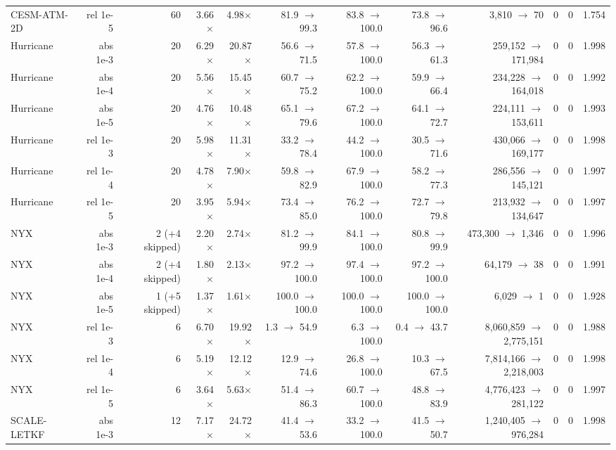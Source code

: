 \begin{tabular}{lrrrrrrrrrrr}
CESM-ATM-2D & rel 1e-5 & 60 & 3.66$\times$ & 4.98$\times$ & 81.9 $\to$ 99.3 & 83.8 $\to$ 100.0 & 73.8 $\to$ 96.6 & 3,810 $\to$ 70 & 0 & 0 & 1.754 \\
Hurricane & abs 1e-3 & 20 & 6.29$\times$ & 20.87$\times$ & 56.6 $\to$ 71.5 & 57.8 $\to$ 100.0 & 56.3 $\to$ 61.3 & 259,152 $\to$ 171,984 & 0 & 0 & 1.998 \\
Hurricane & abs 1e-4 & 20 & 5.56$\times$ & 15.45$\times$ & 60.7 $\to$ 75.2 & 62.2 $\to$ 100.0 & 59.9 $\to$ 66.4 & 234,228 $\to$ 164,018 & 0 & 0 & 1.992 \\
Hurricane & abs 1e-5 & 20 & 4.76$\times$ & 10.48$\times$ & 65.1 $\to$ 79.6 & 67.2 $\to$ 100.0 & 64.1 $\to$ 72.7 & 224,111 $\to$ 153,611 & 0 & 0 & 1.993 \\
Hurricane & rel 1e-3 & 20 & 5.98$\times$ & 11.31$\times$ & 33.2 $\to$ 78.4 & 44.2 $\to$ 100.0 & 30.5 $\to$ 71.6 & 430,066 $\to$ 169,177 & 0 & 0 & 1.998 \\
Hurricane & rel 1e-4 & 20 & 4.78$\times$ & 7.90$\times$ & 59.8 $\to$ 82.9 & 67.9 $\to$ 100.0 & 58.2 $\to$ 77.3 & 286,556 $\to$ 145,121 & 0 & 0 & 1.997 \\
Hurricane & rel 1e-5 & 20 & 3.95$\times$ & 5.94$\times$ & 73.4 $\to$ 85.0 & 76.2 $\to$ 100.0 & 72.7 $\to$ 79.8 & 213,932 $\to$ 134,647 & 0 & 0 & 1.997 \\
NYX & abs 1e-3 & 2 (+4 skipped) & 2.20$\times$ & 2.74$\times$ & 81.2 $\to$ 99.9 & 84.1 $\to$ 100.0 & 80.8 $\to$ 99.9 & 473,300 $\to$ 1,346 & 0 & 0 & 1.996 \\
NYX & abs 1e-4 & 2 (+4 skipped) & 1.80$\times$ & 2.13$\times$ & 97.2 $\to$ 100.0 & 97.4 $\to$ 100.0 & 97.2 $\to$ 100.0 & 64,179 $\to$ 38 & 0 & 0 & 1.991 \\
NYX & abs 1e-5 & 1 (+5 skipped) & 1.37$\times$ & 1.61$\times$ & 100.0 $\to$ 100.0 & 100.0 $\to$ 100.0 & 100.0 $\to$ 100.0 & 6,029 $\to$ 1 & 0 & 0 & 1.928 \\
NYX & rel 1e-3 & 6 & 6.70$\times$ & 19.92$\times$ & 1.3 $\to$ 54.9 & 6.3 $\to$ 100.0 & 0.4 $\to$ 43.7 & 8,060,859 $\to$ 2,775,151 & 0 & 0 & 1.988 \\
NYX & rel 1e-4 & 6 & 5.19$\times$ & 12.12$\times$ & 12.9 $\to$ 74.6 & 26.8 $\to$ 100.0 & 10.3 $\to$ 67.5 & 7,814,166 $\to$ 2,218,003 & 0 & 0 & 1.998 \\
NYX & rel 1e-5 & 6 & 3.64$\times$ & 5.63$\times$ & 51.4 $\to$ 86.3 & 60.7 $\to$ 100.0 & 48.8 $\to$ 83.9 & 4,776,423 $\to$ 281,122 & 0 & 0 & 1.997 \\
SCALE-LETKF & abs 1e-3 & 12 & 7.17$\times$ & 24.72$\times$ & 41.4 $\to$ 53.6 & 33.2 $\to$ 100.0 & 41.5 $\to$ 50.7 & 1,240,405 $\to$ 976,284 & 0 & 0 & 1.998 \\

\end{tabular}
